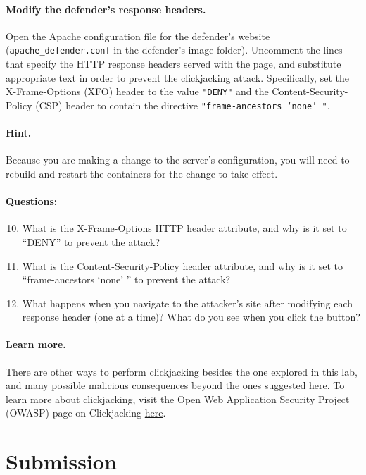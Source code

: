 \paragraph{Modify the defender's response headers.} Open the Apache
configuration file for the defender's website
(\texttt{apache\_defender.conf} in the defender's image folder).
Uncomment the lines that specify the HTTP response headers served with
the page, and substitute appropriate text in order to prevent the
clickjacking attack.  Specifically, set the X-Frame-Options (XFO) header
to the value \texttt{"DENY"} and the Content-Security-Policy (CSP)
header to contain the directive \texttt{"frame-ancestors `none' "}.

\paragraph{Hint.} Because you are making a change to the server's
configuration, you will need to rebuild and restart the containers for
the change to take effect.


\paragraph{Questions:}
\begin{enumerate}
\setcounter{enumi}{9}
    \item What is the X-Frame-Options HTTP header attribute, and why is
    it set to ``DENY'' to prevent the attack?

    \item What is the Content-Security-Policy header attribute, and why
    is it set to ``frame-ancestors `none' '' to prevent the attack?

    \item What happens when you navigate to the attacker's site
    after modifying each response header (one at a time)? What do you
    see when you click the button?
\end{enumerate}

\paragraph{Learn more.}
There are other ways to perform clickjacking besides the one
explored in this lab, and many possible malicious consequences beyond
the ones suggested here. To learn more about clickjacking, visit the
Open Web Application Security Project (OWASP) page on Clickjacking 
\href{https://owasp.org/www-community/attacks/Clickjacking}{here}.

\section{Submission}

\begin{quote}
\seedsubmission
\end{quote}



